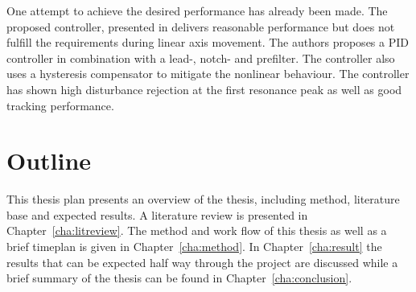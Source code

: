 One attempt to achieve the desired performance has already been made. The proposed controller, presented in \citep{ButcherController:2015} delivers reasonable performance but does not fulfill the requirements during linear axis movement. The authors proposes a PID controller in combination with a lead-, notch- and prefilter. The controller also uses a hysteresis compensator to mitigate the nonlinear behaviour. The controller has shown high disturbance rejection at the first resonance peak as well as good tracking performance.

\section{Outline}
This thesis plan presents an overview of the thesis, including method, literature base and expected results. A literature review is presented in  Chapter~\ref{cha:litreview}. The method and work flow of this thesis as well as a brief timeplan is given in Chapter~\ref{cha:method}. In Chapter~\ref{cha:result} the results that can be expected half way through the project are discussed while a brief summary of the thesis can be found in Chapter~\ref{cha:conclusion}.
